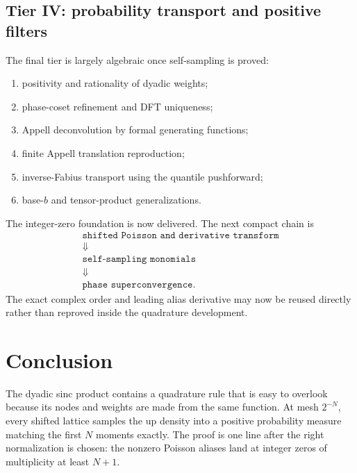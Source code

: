 \documentclass[11pt,oneside]{article}
\numberwithin{equation}{section}
\theoremstyle{definition}
\theoremstyle{remark}
\begin{document}
\subsection{Tier IV: probability transport and positive filters}

The final tier is largely algebraic once self-sampling is proved:
\begin{enumerate}[label=\textbf{IV.\arabic*}]
\item positivity and rationality of dyadic weights;
\item phase-coset refinement and DFT uniqueness;
\item Appell deconvolution by formal generating functions;
\item finite Appell translation reproduction;
\item inverse-Fabius transport using the quantile pushforward;
\item base-$b$ and tensor-product generalizations.
\end{enumerate}

\begin{statusbox}
The integer-zero foundation is now delivered.  The next compact chain is
\[
 \begin{gathered}
 \texttt{shifted Poisson and derivative transform}\\
 \Downarrow\\
 \texttt{self-sampling monomials}\\
 \Downarrow\\
 \texttt{phase superconvergence}.
 \end{gathered}
\]
The exact complex order and leading alias derivative may now be reused
directly rather than reproved inside the quadrature development.
\end{statusbox}

\section{Conclusion}
\label{p3:sec:conclusion}

The dyadic sinc product contains a quadrature rule that is easy to overlook because its nodes and weights are made from the same function.  At mesh $2^{-N}$, every shifted lattice samples the up density into a positive probability measure matching the first $N$ moments exactly.  The proof is one line after the right normalization is chosen: the nonzero Poisson aliases land at integer zeros of multiplicity at least $N+1$.
\end{document}
